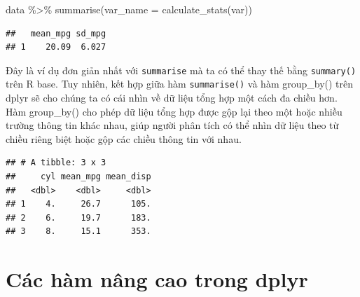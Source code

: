\documentclass[]{krantz}
\makeatletter
\newenvironment{Shaded}{\begin{snugshade}}{\end{snugshade}}
\newcommand{\DataTypeTok}[1]{\textcolor[rgb]{0.27,0.27,0.27}{#1}}
\newcommand{\KeywordTok}[1]{\textcolor[rgb]{0.27,0.27,0.27}{\textbf{#1}}}
\newcommand{\NormalTok}[1]{#1}
\newcommand{\OperatorTok}[1]{\textcolor[rgb]{0.43,0.43,0.43}{\textbf{#1}}}
\newcommand{\StringTok}[1]{\textcolor[rgb]{0.5,0.5,0.5}{#1}}
\renewenvironment{quote}{\begin{VF}}{\end{VF}}
\newenvironment{kframe}{%
\medskip{}
\setlength{\fboxsep}{.8em}
 \def\at@end@of@kframe{}%
 \ifinner\ifhmode%
  \def\at@end@of@kframe{\end{minipage}}%
  \begin{minipage}{\columnwidth}%
 \fi\fi%
 \def\FrameCommand##1{\hskip\@totalleftmargin \hskip-\fboxsep
 \colorbox{shadecolor}{##1}\hskip-\fboxsep
     \hskip-\linewidth \hskip-\@totalleftmargin \hskip\columnwidth}%
 \MakeFramed {\advance\hsize-\width
   \@totalleftmargin\z@ \linewidth\hsize
   \@setminipage}}%
 {\par\unskip\endMakeFramed%
 \at@end@of@kframe}
\renewenvironment{Shaded}{\begin{kframe}}{\end{kframe}}
\renewenvironment{Shaded}{\begin{snugshade}}{\end{snugshade}}
\renewcommand{\DataTypeTok}[1]{\textcolor[rgb]{0.13,0.29,0.53}{#1}}
\renewcommand{\KeywordTok}[1]{\textcolor[rgb]{0.13,0.29,0.53}{\textbf{#1}}}
\renewcommand{\NormalTok}[1]{#1}
\renewcommand{\OperatorTok}[1]{\textcolor[rgb]{0.81,0.36,0.00}{\textbf{#1}}}
\renewcommand{\StringTok}[1]{\textcolor[rgb]{0.31,0.60,0.02}{#1}}
\theoremstyle{definition}
\theoremstyle{definition}
\theoremstyle{definition}
\theoremstyle{remark}
\makeatother
\begin{document}
\begin{quote}
data \%\textgreater{}\% summarise(var\_name = calculate\_stats(var))
\end{quote}

\begin{Shaded}
\end{Shaded}

\begin{verbatim}
##   mean_mpg sd_mpg
## 1    20.09  6.027
\end{verbatim}

Đây là ví dụ đơn giản nhất với \texttt{summarise} mà ta có thể thay thế
bằng \texttt{summary()} trên R base. Tuy nhiên, kết hợp giữa hàm
\texttt{summarise()} và hàm group\_by() trên dplyr sẽ cho chúng ta có
cái nhìn về dữ liệu tổng hợp một cách đa chiều hơn. Hàm group\_by() cho
phép dữ liệu tổng hợp được gộp lại theo một hoặc nhiều trường thông tin
khác nhau, giúp người phân tích có thể nhìn dữ liệu theo từ chiều riêng
biệt hoặc gộp các chiều thông tin với nhau.

\begin{Shaded}
\end{Shaded}

\begin{verbatim}
## # A tibble: 3 x 3
##     cyl mean_mpg mean_disp
##   <dbl>    <dbl>     <dbl>
## 1    4.     26.7      105.
## 2    6.     19.7      183.
## 3    8.     15.1      353.
\end{verbatim}

\hypertarget{cac-ham-nang-cao-trong-dplyr}{%
\section{Các hàm nâng cao trong
dplyr}\label{cac-ham-nang-cao-trong-dplyr}}
\end{document}
